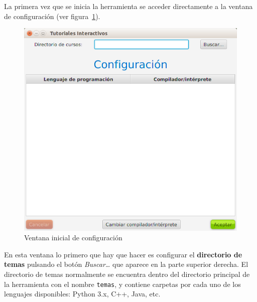 \documentclass[]{article}
\begin{document}
La primera vez que se inicia la herramienta se acceder directamente a la ventana de configuración (ver figura~\ref{fig:config1}).
%
\begin{figure}[tbp]
	\begin{center}
		\includegraphics[scale=0.4]{Configuracion_vacia.png}
	\end{center}
	\caption{Ventana inicial de configuración\label{fig:config1}}
\end{figure}
%
En esta ventana lo primero que hay que hacer es configurar el \textbf{directorio de temas} pulsando el botón \emph{Buscar\ldots} que aparece en la parte superior derecha. El directorio de temas normalmente se encuentra dentro del directorio principal de la herramienta con el nombre \texttt{temas}, y contiene carpetas por cada uno de los lenguajes disponibles: Python 3.x, C++, Java, etc. 
\end{document}
